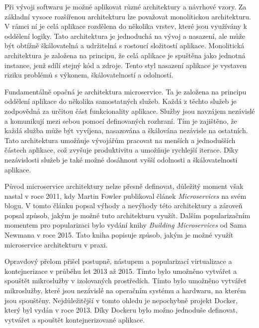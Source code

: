 

Při vývoji softwaru je možné aplikovat různé architektury a návrhové vzory. Za základní vysoce rozšířenou architekturu lze považovat monolitickou architekturu. V rámci ní je celá aplikace rozdělena do několika vrstev, které jsou využívány k oddělení logiky. Tato architektura je jednoduchá na vývoj a nasazení, ale může být obtížně škálovatelná a udržitelná s rostoucí složitostí aplikace. Monolitická architektura je založena na principu, že celá aplikace je spuštěna jako jednotná instance, jenž sdílí stejný kód a zdroje. Tento styl nasazení aplikace je vystaven riziku problémů s výkonem, škálovatelností a odolností.

Fundamentálně opačná je architektura microservice. Ta je založena na principu oddělení aplikace do několika samostatných služeb. Každá z těchto služeb je zodpovědná za určitou část funkcionality aplikace. Služby jsou navzájem nezávislé a komunikují mezi sebou pomocí definovaných rozhraní. Tím je zajištěno, že každá služba může být vyvíjena, nasazována a škálována nezávisle na ostatních. Tato architektura umožňuje vývojářům pracovat na menších a jednodušších částech aplikace, což zvyšuje produktivitu a umožňuje rychlejší iterace. Díky nezávislosti služeb je také možné dosáhnout vyšší odolnosti a škálovatelnosti aplikace. \cite{Martin2018}


Původ microservice architektury nelze přesně definovat, důležitý moment však nastal v roce 2011, kdy Martin Fowler publikoval článek \textit{Microservices} na svém blogu. V tomto článku popsal výhody a nevýhody této architektury a zároveň popsal způsob, jakým je možné tuto architekturu využít. Dalším popularizačním momentem pro popularizaci bylo vydání knihy \textit{Building Microservices} od Sama Newmana v roce 2015. Tato kniha popisuje způsob, jakým je možné využít microservice architekturu v praxi.

Opravdový přelom přišel postupně, nástupem a popularizací virtualizace a kontejnerizace v průběhu let 2013 až 2015. Tímto bylo umožněno vytvářet a spouštět mikroslužby v izolovaných prostředích. Tímto bylo umožněno vytvářet mikroslužby, které jsou nezávislé na operačním systému a hardwaru, na kterém jsou spouštěny. Nejdůležitější v tomto ohledu je nepochybně projekt Docker, který byl vydán v roce 2013. Díky Dockeru bylo možno jednoduše definovat, vytvářet a spouštět kontejnerizované aplikace.

